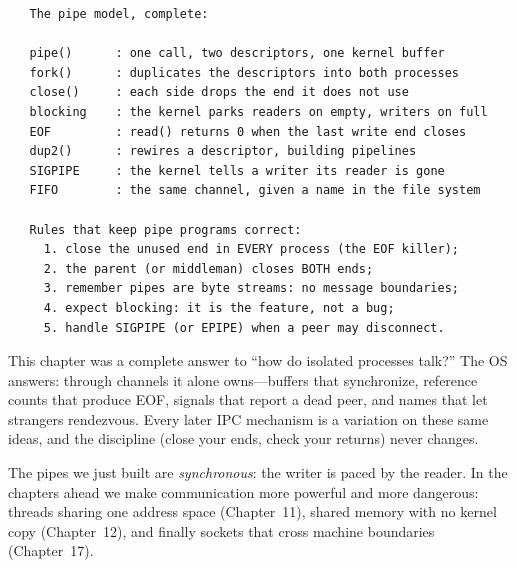 \begin{verbatim}
   The pipe model, complete:

   pipe()      : one call, two descriptors, one kernel buffer
   fork()      : duplicates the descriptors into both processes
   close()     : each side drops the end it does not use
   blocking    : the kernel parks readers on empty, writers on full
   EOF         : read() returns 0 when the last write end closes
   dup2()      : rewires a descriptor, building pipelines
   SIGPIPE     : the kernel tells a writer its reader is gone
   FIFO        : the same channel, given a name in the file system

   Rules that keep pipe programs correct:
     1. close the unused end in EVERY process (the EOF killer);
     2. the parent (or middleman) closes BOTH ends;
     3. remember pipes are byte streams: no message boundaries;
     4. expect blocking: it is the feature, not a bug;
     5. handle SIGPIPE (or EPIPE) when a peer may disconnect.
\end{verbatim}

\begin{osconcept}
This chapter was a complete answer to ``how do isolated processes
talk?'' The OS answers: through channels it alone owns---buffers that
synchronize, reference counts that produce EOF, signals that report a
dead peer, and names that let strangers rendezvous. Every later IPC
mechanism is a variation on these same ideas, and the discipline
(close your ends, check your returns) never changes.
\end{osconcept}

The pipes we just built are \emph{synchronous}: the writer is paced by
the reader. In the chapters ahead we make communication more powerful
and more dangerous: threads sharing one address space (Chapter~11),
shared memory with no kernel copy (Chapter~12), and finally sockets
that cross machine boundaries (Chapter~17).

